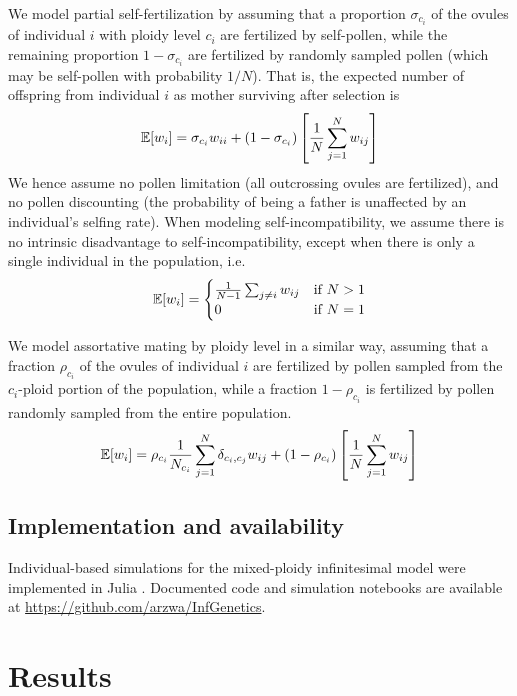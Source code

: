 \documentclass[12pt,a4paper]{article}
\begin{document}
We model partial self-fertilization by assuming that a proportion
$\sigma_{c_i}$ of the ovules of individual $i$ with ploidy level $c_i$ are
fertilized by self-pollen, while the remaining proportion $1-\sigma_{c_i}$ are
fertilized by randomly sampled pollen (which may be self-pollen with
probability $1/N$). 
That is, the expected number of offspring from individual $i$ as mother
surviving after selection is
\begin{equation}
\mathbb{E}[w_i] = \sigma_{c_i} w_{ii} +
  (1-\sigma_{c_i})\left[\frac{1}{N}\sum_{j=1}^N w_{ij}\right]
\end{equation}
We hence assume no pollen limitation (all outcrossing ovules are fertilized),
and no pollen discounting (the probability of being a father is unaffected by
an individual's selfing rate).
When modeling self-incompatibility, we assume there is no intrinsic
disadvantage to self-incompatibility, except when there is only a single
individual in the population, i.e.
\begin{equation}
\mathbb{E}[w_i] = \begin{cases}
    \frac{1}{N-1}\sum_{j \ne i }w_{ij} & \text{if } N > 1\\ 
    0 & \text{if } N=1 \end{cases}
\end{equation}

We model assortative mating by ploidy level in a similar way, assuming that a
fraction $\rho_{c_i}$ of the ovules of individual $i$ are fertilized by pollen
sampled from the $c_i$-ploid portion of the population, while a fraction
$1-\rho_{c_i}$ is fertilized by pollen randomly sampled from the entire
population.
\begin{equation}
\mathbb{E}[w_i] = \rho_{c_i} \frac{1}{N_{c_{i}}} \sum_{j=1}^N \delta_{c_i,c_j}w_{ij}
 + (1-\rho_{c_i})
\left[\frac{1}{N}\sum_{j=1}^N w_{ij}\right]
\end{equation}

\subsection*{Implementation and availability}

Individual-based simulations for the mixed-ploidy infinitesimal model were
implemented in Julia \citep{julia}.
Documented code and simulation notebooks are available at
\url{https://github.com/arzwa/InfGenetics}.

\section*{Results}
\end{document}
